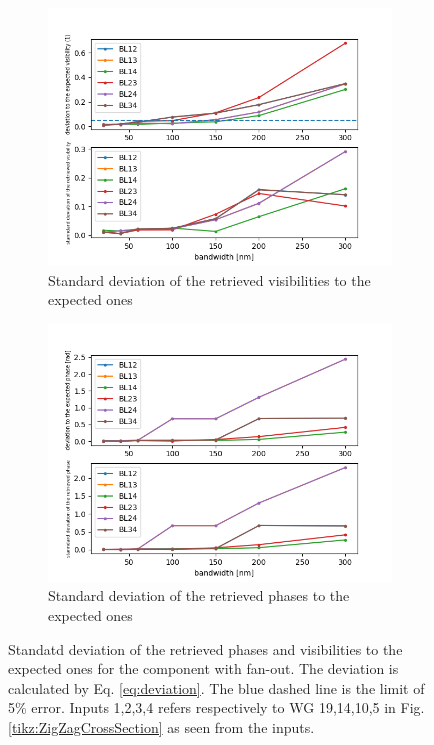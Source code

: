 \begin{figure}[htbp]
    \centering
    \begin{subfigure}{.45\textwidth}
        \includegraphics[scale=.45]{picture/retrieval_simu/visi_retrieved_fan.png}
        \caption{Standard deviation  of the retrieved visibilities to the expected ones}
    \end{subfigure}%
    \begin{subfigure}{.45\textwidth}
    \includegraphics[scale=.45]{picture/retrieval_simu/phase_retrieved_fan.png}
    \caption{Standard deviation of the retrieved phases to the expected ones}
    \end{subfigure}
    \caption{Standatd deviation of the retrieved phases and visibilities to the expected ones for the component with fan-out. The deviation is calculated by Eq. \ref{eq:deviation}. The blue dashed line is the limit of 5\% error. Inputs 1,2,3,4 refers respectively to WG 19,14,10,5 in Fig.\ref{tikz:ZigZagCrossSection} as seen from the inputs.}
    \label{fig:retrieved_fan}
\end{figure}

